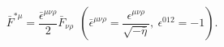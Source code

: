 \begin{equation}
\bar{F}^{\ast\mu}=\frac{\bar{\epsilon}^{\mu\nu\rho}}{2}
\bar{F}_{\nu\rho}~~(\bar{\epsilon}^{\mu\nu\rho}=
\frac{\epsilon^{\mu\nu\rho}}{\sqrt{-\bar{\eta}}},~\epsilon^{012}=-1).
\end{equation}

